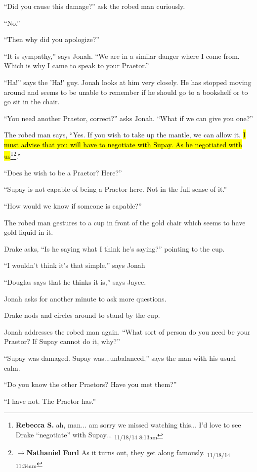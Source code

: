 ``Did you cause this damage?'' ask the robed man curiously.

``No.''

``Then why did you apologize?''

``It is sympathy,'' says Jonah.  ``We are in a similar danger where I come from. Which is why I came to speak to your Praetor.''

``Ha!'' says the 'Ha!' guy.  Jonah looks at him very closely.  He has stopped moving around and seems to be unable to remember if he should go to a bookshelf or to go sit in the chair.

``You need another Praetor, correct?'' asks Jonah. ``What if we can give you one?''

The robed man says, ``Yes.  If you wish to take up the mantle, we can allow it.  \hl{I must advise that you will have to negotiate with Supay.  As he negotiated with us}\footnote{\textbf{Rebecca S. }ah, man... am sorry we missed watching this... I'd love to see Drake ``negotiate'' with Supay... \textsubscript{11/18/14 8:13am}}\footnote{$\rightarrow$\textbf{Nathaniel Ford }As it turns out, they get along famously. \textsubscript{11/18/14 11:34am}}.''

``Does he wish to be a Praetor?  Here?''

``Supay is not capable of being a Praetor here.  Not in the full sense of it.''

``How would we know if someone is capable?''

The robed man gestures to a cup in front of the gold chair which seems to have gold liquid in it.

Drake asks, ``Is he saying what I think he's saying?'' pointing to the cup.

``I wouldn't think it's that simple,'' says Jonah

``Douglas says that he thinks it is,'' says Jayce.

Jonah asks for another minute to ask more questions.

Drake nods and circles around to stand by the cup.

Jonah addresses the robed man again. ``What sort of person do you need be your Praetor?  If Supay cannot do it, why?''

``Supay was damaged.  Supay was...unbalanced,'' says the man with his usual calm.

``Do you know the other Praetors?  Have you met them?''

``I have not.  The Praetor has.''

